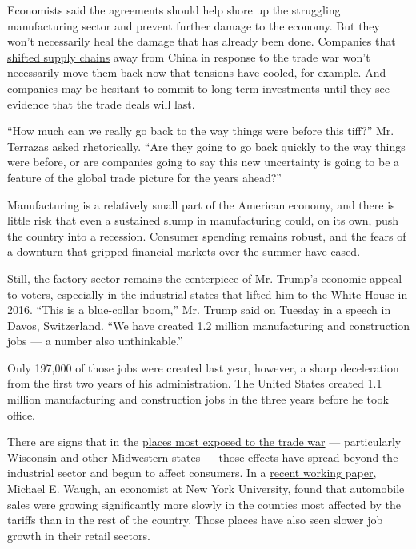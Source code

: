 Economists said the agreements should help shore up the struggling
manufacturing sector and prevent further damage to the economy. But they
won't necessarily heal the damage that has already been done. Companies
that
\href{https://www.nytimes3xbfgragh.onion/2019/05/30/business/economy/trump-tariff-manufacturer.html}{shifted
supply chains} away from China in response to the trade war won't
necessarily move them back now that tensions have cooled, for example.
And companies may be hesitant to commit to long-term investments until
they see evidence that the trade deals will last.

``How much can we really go back to the way things were before this
tiff?'' Mr. Terrazas asked rhetorically. ``Are they going to go back
quickly to the way things were before, or are companies going to say
this new uncertainty is going to be a feature of the global trade
picture for the years ahead?''

Manufacturing is a relatively small part of the American economy, and
there is little risk that even a sustained slump in manufacturing could,
on its own, push the country into a recession. Consumer spending remains
robust, and the fears of a downturn that gripped financial markets over
the summer have eased.

Still, the factory sector remains the centerpiece of Mr. Trump's
economic appeal to voters, especially in the industrial states that
lifted him to the White House in 2016. ``This is a blue-collar boom,''
Mr. Trump said on Tuesday in a speech in Davos, Switzerland. ``We have
created 1.2 million manufacturing and construction jobs --- a number
also unthinkable.''

Only 197,000 of those jobs were created last year, however, a sharp
deceleration from the first two years of his administration. The United
States created 1.1 million manufacturing and construction jobs in the
three years before he took office.

There are signs that in the
\href{https://www.nytimes3xbfgragh.onion/interactive/2019/12/16/business/trump-midwest-swing-jobs.html}{places
most exposed to the trade war} --- particularly Wisconsin and other
Midwestern states --- those effects have spread beyond the industrial
sector and begun to affect consumers. In a
\href{http://www.waugheconomics.com/uploads/2/2/5/6/22563786/waugh_consumption.pdf}{recent
working paper}, Michael E. Waugh, an economist at New York University,
found that automobile sales were growing significantly more slowly in
the counties most affected by the tariffs than in the rest of the
country. Those places have also seen slower job growth in their retail
sectors.

